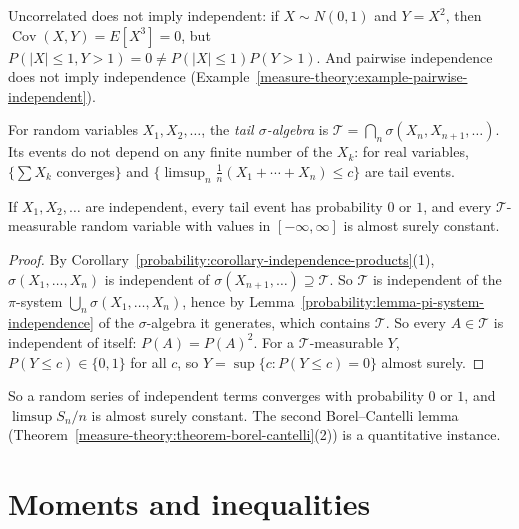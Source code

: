 \begin{counterexample}\label{probability:counterexample-uncorrelated}
Uncorrelated does not imply independent: if $X \sim N(0, 1)$ and $Y = X^2$, then $\operatorname{Cov}(X, Y) = E[X^3] = 0$, but $P(|X| \leq 1, Y > 1) = 0 \neq P(|X| \leq 1)P(Y > 1)$. And pairwise independence does not imply
independence (Example~\ref{measure-theory:example-pairwise-independent}).
\end{counterexample}

\begin{definition}\label{probability:definition-tail}
For random variables $X_1, X_2, \ldots$, the \emph{tail $\sigma$-algebra} is $\mathcal{T} = \bigcap_n\sigma(X_n, X_{n+1}, \ldots)$. Its events do not depend on any finite number of the $X_k$: for real variables, $\{\sum X_k$
converges$\}$ and $\{\limsup_n\frac1n(X_1 + \cdots + X_n) \leq c\}$ are tail events.
\end{definition}

\begin{theorem}\label{probability:theorem-zero-one}
If $X_1, X_2, \ldots$ are independent, every tail event has probability $0$ or $1$, and every $\mathcal{T}$-measurable random variable with values in $[-\infty, \infty]$ is almost surely constant.
\end{theorem}

\begin{proof}
By Corollary~\ref{probability:corollary-independence-products}(1), $\sigma(X_1, \ldots, X_n)$ is independent of $\sigma(X_{n+1}, \ldots) \supseteq \mathcal{T}$. So $\mathcal{T}$ is independent of the $\pi$-system
$\bigcup_n\sigma(X_1, \ldots, X_n)$, hence by Lemma~\ref{probability:lemma-pi-system-independence} of the $\sigma$-algebra it generates, which contains $\mathcal{T}$. So every $A \in \mathcal{T}$ is independent of itself:
$P(A) = P(A)^2$. For a $\mathcal{T}$-measurable $Y$, $P(Y \leq c) \in \{0, 1\}$ for all $c$, so $Y = \sup\{c : P(Y \leq c) = 0\}$ almost surely.
\end{proof}

So a random series of independent terms converges with probability $0$ or $1$, and $\limsup S_n/n$ is almost surely constant. The second Borel--Cantelli lemma (Theorem~\ref{measure-theory:theorem-borel-cantelli}(2)) is a
quantitative instance.

\section{Moments and inequalities}\label{probability:section-inequalities}

